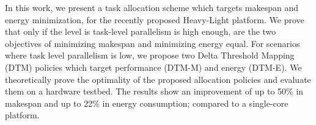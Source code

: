 
In this work, we present a task allocation scheme which targets makespan and energy minimization, for the recently proposed Heavy-Light platform. We prove that only if the level is task-level parallelism is high enough, are the two objectives of minimizing makespan and minimizing energy equal. %
For scenarios where task level parallelism is low, we propose two Delta Threshold Mapping (DTM) policies which target performance (DTM-M) and energy (DTM-E). We theoretically prove the optimality of the proposed allocation policies and evaluate them on a hardware testbed. The results show an improvement of up to 50\% in makespan and up to 22\% in energy consumption; compared to a single-core platform.


